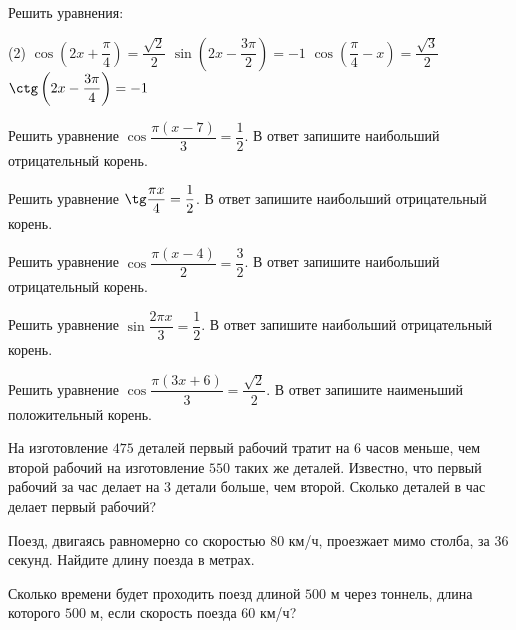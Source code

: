 \begin{class}[number=3]
\begin{listofex}
\begin{tasks}
		\end{tasks}
		\item Решить уравнения:
		\begin{tasks}(2)
			\task \( \cos\left( 2x+\dfrac{\pi}{4} \right)=\dfrac{\sqrt{2}}{2} \)
			\task \( \sin \left( 2x-\dfrac{3\pi}{2} \right) = -1 \)
			\task \( \cos \left( \dfrac{\pi}{4}-x \right)=\dfrac{\sqrt{3}}{2} \)
			\task \( \ctg\left( 2x-\dfrac{3\pi}{4} \right)=-1 \)
		\end{tasks}
		\item Решить уравнение \( \cos\dfrac{\pi(x-7)}{3}=\dfrac{1}{2} \). В ответ запишите наибольший отрицательный корень.
		\item Решить уравнение \( \tg\dfrac{\pi x}{4}=\dfrac{1}{2} \). В ответ запишите наибольший отрицательный корень.
		\item Решить уравнение \( \cos\dfrac{\pi(x-4)}{2}=\dfrac{3}{2} \). В ответ запишите наибольший отрицательный корень.
		\item Решить уравнение \( \sin\dfrac{2\pi x}{3}=\dfrac{1}{2} \). В ответ запишите наибольший отрицательный корень.
		\item Решить уравнение \( \cos\dfrac{\pi(3x+6)}{3}=\dfrac{\sqrt{2}}{2} \). В ответ запишите наименьший положительный корень.
		\item На изготовление \(475\) деталей первый рабочий тратит на \(6\) часов меньше, чем второй рабочий на изготовление \(550\) таких же деталей. Известно, что первый рабочий за час делает на \(3\) детали больше, чем второй. Сколько деталей в час делает первый рабочий?
		\item Поезд, двигаясь равномерно со скоростью \(80\) км/ч, проезжает мимо столба, за \(36\) секунд. Найдите длину поезда в метрах.
		\item Сколько времени будет проходить поезд длиной \(500\) м через тоннель, длина которого \(500\) м, если скорость поезда \(60\) км/ч?

\end{listofex}
\end{class}
